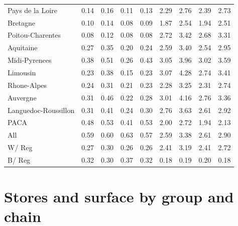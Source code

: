 \documentclass[11pt]{article}
\begin{document}
\begin{table}[H]
\begin{tabular}{l|rrrr|rrrr}
Pays de la Loire           &        0.14 &          0.16 &          0.11 &          0.13 &       2.29 &       2.76 &       2.39 &       2.73 \\
Bretagne                   &        0.10 &          0.14 &          0.08 &          0.09 &       1.87 &       2.54 &       1.94 &       2.51 \\
Poitou-Charentes           &        0.08 &          0.12 &          0.08 &          0.08 &       2.72 &       3.42 &       2.68 &       3.31 \\
Aquitaine                  &        0.27 &          0.35 &          0.20 &          0.24 &       2.59 &       3.40 &       2.54 &       2.95 \\
Midi-Pyrenees              &        0.38 &          0.51 &          0.26 &          0.43 &       3.05 &       3.96 &       3.02 &       3.59 \\
Limousin                   &        0.23 &          0.38 &          0.15 &          0.23 &       3.07 &       4.28 &       2.74 &       3.41 \\
Rhone-Alpes                &        0.24 &          0.31 &          0.21 &          0.23 &       2.28 &       3.25 &       2.31 &       2.74 \\
Auvergne                   &        0.31 &          0.46 &          0.22 &          0.28 &       3.01 &       4.16 &       2.76 &       3.36 \\
Languedoc-Roussillon       &        0.31 &          0.41 &          0.24 &          0.30 &       2.76 &       3.63 &       2.61 &       2.92 \\
PACA &        0.48 &          0.53 &          0.41 &          0.53 &       2.00 &       2.72 &       1.94 &       2.13 \\
\midrule
All                        &        0.59 &          0.60 &          0.63 &          0.57 &       2.59 &       3.38 &       2.61 &       2.90 \\
W/ Reg                     &        0.27 &          0.30 &          0.26 &          0.26 &       2.41 &       3.19 &       2.41 &       2.72 \\
B/ Reg                     &        0.32 &          0.30 &          0.37 &          0.32 &       0.18 &       0.19 &       0.20 &       0.18 \\
\bottomrule
\end{tabular}

\end{table}


\section{Stores and surface by group and chain}
\end{document}
